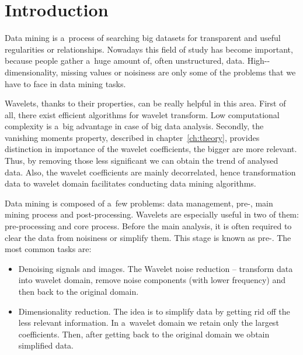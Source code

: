 \chapter*{Introduction}

Data mining is a~process of searching big datasets for transparent and useful regularities or relationships. 
Nowadays this field of study has become important, because people gather a~huge amount of, often unstructured, data. High-\allowbreak-dimensionality, missing values or noisiness are only some of the problems that we have to face in data mining tasks. 

Wavelets, thanks to their properties, can be really helpful in this area. First of all, there exist efficient algorithms for wavelet transform. Low computational complexity is a~big advantage in case of big data analysis. Secondly, the vanishing moments property, described in chapter~\ref{ch:theory}, provides distinction in importance of the wavelet coefficients, the bigger are more relevant. Thus, by removing those less significant we can obtain the trend of analysed data. Also, the wavelet coefficients are mainly decorrelated, hence transformation data to wavelet domain facilitates conducting data mining algorithms.
 

Data mining is composed of a~few problems: data management, pre-, main mining process and post-processing. Wavelets are especially useful in two of them: pre-processing and core process. Before the main analysis, it is often required to clear the data from noisiness or simplify them. This stage is known as pre-. The most common tasks are:
\begin{itemize}
\item Denoising signals and images. The Wavelet noise reduction -- transform data into wavelet domain, remove noise components (with lower frequency) and then back to the original domain.

\item Dimensionality reduction. The idea is to simplify data by getting rid off the less relevant information. In a~wavelet domain we retain only the largest coefficients. Then, after getting back to the original domain we obtain simplified data.
\end{itemize}

